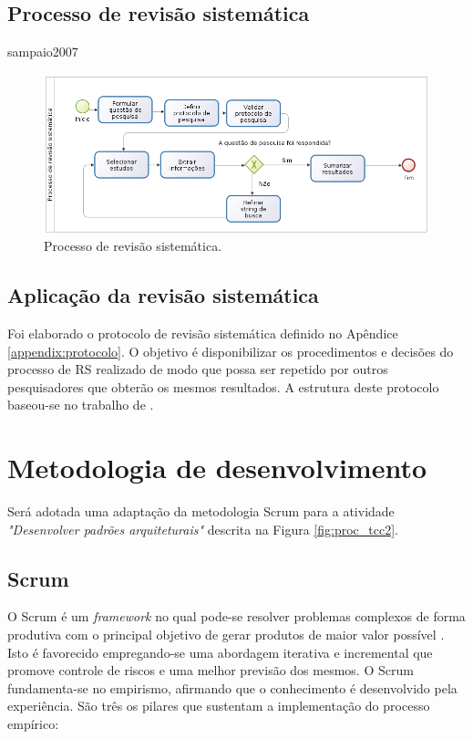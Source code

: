 \subsection{Processo de revisão sistemática}

sampaio2007

\begin{figure}[!htb]
    \centering
    \includegraphics[scale=0.5]{figuras/processo_rs}
    \caption{Processo de revisão sistemática.}
    \label{fig:processo_rs}     
\end{figure}

\pagebreak


\subsection{Aplicação da revisão sistemática}

Foi elaborado o protocolo de revisão sistemática definido no Apêndice \ref{appendix:protocolo}. O objetivo é disponibilizar os procedimentos e decisões do processo de RS realizado de modo que possa ser repetido por outros pesquisadores que obterão os mesmos resultados. A estrutura deste protocolo baseou-se no trabalho de .


\section{Metodologia de desenvolvimento} \label{sec:metodologia_desenvolvimento}

Será adotada uma adaptação da metodologia Scrum para a atividade \textit{"Desenvolver padrões arquiteturais"} descrita na Figura \ref{fig:proc_tcc2}. 

\subsection{Scrum} \label{sec:scrum}

O Scrum é um \textit{framework} no qual pode-se resolver problemas complexos de forma produtiva com o principal objetivo de gerar produtos de maior valor possível \cite{schwaber2016}. Isto é favorecido empregando-se uma abordagem iterativa e incremental que promove controle de riscos e uma melhor previsão dos mesmos. O Scrum fundamenta-se no empirismo, afirmando que o conhecimento é desenvolvido pela experiência. São três os pilares que sustentam a implementação do processo empírico:

